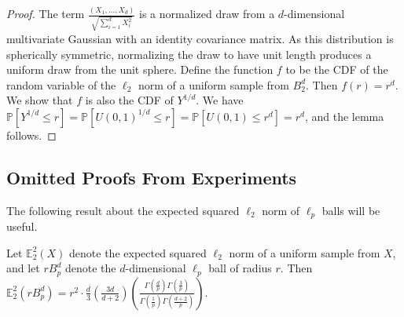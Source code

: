 \ballSample*
\begin{proof}
    The term $\frac{(X_1, \ldots, X_d)}{\sqrt{\sum_{i=1}^d X_i^2}}$ is a  normalized draw from a $d$-dimensional multivariate Gaussian with an identity covariance matrix. As this distribution is spherically symmetric, normalizing the draw to have unit length produces a uniform draw from the unit sphere. Define the function $f$ to be the CDF of the random variable of the $\ell_2$ norm of a uniform sample from $B_{2}^{d}$. Then $f(r) = r^{d}$. We show that $f$ is also the CDF of $Y^{1/d}$. We have $\mathbb{P}[Y^{1/d} \leq r] = \mathbb{P}[U(0,1)^{1/d} \leq r] = \mathbb{P}[U(0,1) \leq r^{d}] = r^{d}$, and the lemma follows.
\end{proof}

\subsection{Omitted Proofs From Experiments}
\label{subsec:appendix_experiments}
The following result about the expected squared $\ell_2$ norm of $\ell_p$ balls will be useful.

\begin{lemma}
\label{lem:expected_squared_norm}
    Let $\mathbb{E}_{2}^{2}(X)$ denote the expected squared $\ell_2$ norm of a uniform sample from $X$, and let $rB_p^d$ denote the $d$-dimensional $\ell_p$ ball of radius $r$. Then $\mathbb{E}_{2}^{2}(rB_{p}^{d}) = r^2 \cdot \frac{d}{3}\left(\frac{3d}{d+2}\right)\left(\frac{\Gamma(\frac{d}{p}) \Gamma(\frac{3}{p})}{\Gamma(\frac{1}{p}) \Gamma(\frac{d+2}{p})}\right)$.
\end{lemma}

